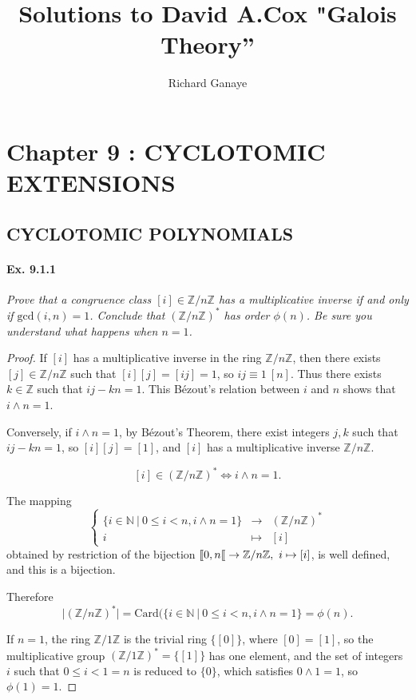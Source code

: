 \documentclass[11pt,a4paper]{article}
\title{Solutions to David A.Cox  "Galois Theory''}
\author{Richard Ganaye}
\def\gcro{\mbox{[\hspace{-.15em}[}}%
\newcommand{\Z}{\mathbb{Z}}
\newcommand{\N}{\mathbb{N}}
\begin{document}
\section{Chapter 9 : CYCLOTOMIC EXTENSIONS}

\subsection{CYCLOTOMIC POLYNOMIALS}

\paragraph{Ex. 9.1.1}

{\it Prove that a congruence class $[i] \in \Z/n\Z$ has a multiplicative inverse if and only if $\mathrm{gcd}(i,n) = 1$. Conclude that $(\Z/n\Z)^*$ has order $\phi(n)$. Be sure you understand what happens when $n=1$.
}

\begin{proof}
If $[i]$ has a multiplicative inverse in the ring $\Z/n\Z$, then there exists $[j] \in \Z/n\Z$ such  that $[i][j] = [ij] = 1$, so $ij \equiv 1\ [n]$. Thus there exists $k\in \Z$ such that $ij - k n =1$. This B\'ezout's relation between $i$ and $n$ shows that $i\wedge n=1$.

Conversely, if $i\wedge n=1$, by  B\'ezout's Theorem, there exist integers $j,k$ such that $ij-kn=1$, so $[i] [j] = [1]$, and $[i]$ has a multiplicative inverse $\Z/n\Z$.

$$[i] \in (\Z/n\Z)^* \iff i\wedge n=1.$$

The mapping 
$$
\left\{
\begin{array}{ccc}
\{i \in \N\  \vert \ 0\leq i <n, i \wedge n = 1\} &  \to  &  (\Z/n\Z)^* \\
 i  &  \mapsto &   [i]
\end{array}
\right.
$$
obtained by restriction of the bijection $\gcro 0, n \gcro \to\Z/n\Z ,\  i \mapsto [i]$,  is well defined, and this is a bijection.

Therefore $$\vert (\Z/n\Z)^* \vert = \mathrm{Card} (\{i \in \N\  \vert \ 0\leq i <n, i \wedge n = 1\} = \phi(n).$$

If $n = 1$, the ring $\Z/1\Z$ is the trivial ring $\{[0]\}$, where $[0]=[1]$, so the multiplicative group $(\Z/1\Z)^* = \{[1]\}$ has one element, and the set of integers $i$ such that $0 \leq i < 1=n$ is reduced to $\{0\}$, which satisfies $0\wedge 1 = 1$, so $ \phi(1)=1$.
\end{proof}
\end{document}
